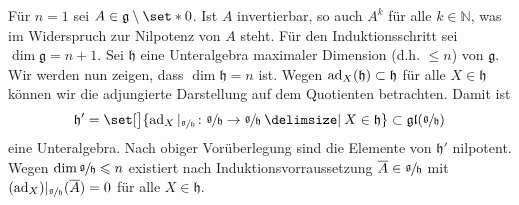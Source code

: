 \begin{beweis}
	Für $n=1$ sei $A \in \mathfrak{g} \setminus \set*{0}$.
	Ist $A$ invertierbar, so auch $A^k$ für alle $k \in \mathbb{N}$, was im Widerspruch zur Nilpotenz von $A$ steht.
	Für den Induktionsschritt sei $\dim \mathfrak{g} = n+1$.
	Sei $\mathfrak{h}$ eine Unteralgebra maximaler Dimension (d.h. $\le n$) von $\mathfrak{g}$.
	Wir werden nun zeigen, dass $\dim \mathfrak{h}=n$ ist.
	Wegen $\operatorname{ad}_X(\mathfrak{h}) \subset \mathfrak{h}$ für alle $X \in \mathfrak{h}$ können wir die adjungierte Darstellung auf dem Quotienten betrachten.
	Damit ist 
	\[
		\mathfrak{h}' = \set[\big]{\ad_X|_{\sfrac{\mathfrak{g}}{\mathfrak{h}}} \colon \sfrac{\mathfrak{g}}{\mathfrak{h}} \to \sfrac{\mathfrak{g}}{\mathfrak{h}} \given X \in \mathfrak{h}} \subset \mathfrak{gl}\enbrace*{\sfrac{\mathfrak{g}}{\mathfrak{h}}}
	\]
	eine Unteralgebra.
	Nach obiger Vorüberlegung sind die Elemente von $\mathfrak{h}'$ nilpotent.
	Wegen $\dim \sfrac{\mathfrak{g}}{\mathfrak{h}} \leqslant n$ existiert nach Induktionsvorraussetzung $\overline{A} \in \sfrac{\mathfrak{g}}{\mathfrak{h}}$ mit $(\operatorname{ad}_X)|_{\sfrac{\mathfrak{g}}{\mathfrak{h}}}(\overline{A})=0$ für alle $X \in \mathfrak{h}$.

\end{beweis}
